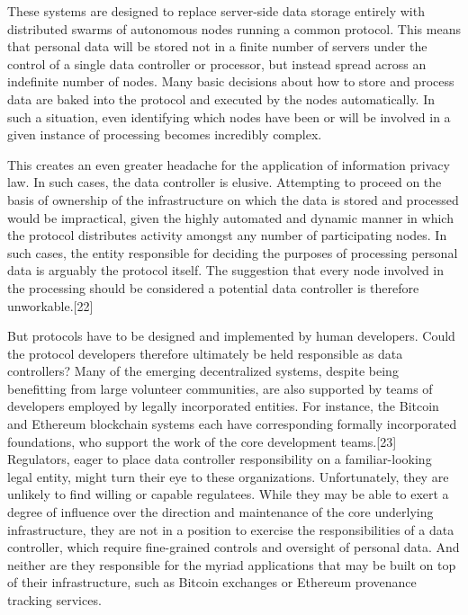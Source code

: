 \documentclass{acm_proc_article-sp}
\begin{document}
These systems are designed to replace server-side data storage entirely with distributed swarms of autonomous nodes running a common protocol. This means that personal data will be stored not in a finite number of servers under the control of a single data controller or processor, but instead spread across an indefinite number of nodes. Many basic decisions about how to store and process data are baked into the protocol and executed by the nodes automatically. In such a situation, even identifying which nodes have been or will be involved in a given instance of processing becomes incredibly complex.
 
This creates an even greater headache for the application of information privacy law. In such cases, the data controller is elusive. Attempting to proceed on the basis of ownership of the infrastructure on which the data is stored and processed would be impractical, given the highly automated and dynamic manner in which the protocol distributes activity amongst any number of participating nodes. In such cases, the entity responsible for deciding the purposes of processing personal data is arguably the protocol itself. The suggestion that every node involved in the processing should be considered a potential data controller is therefore unworkable.[22]
 
But protocols have to be designed and implemented by human developers. Could the protocol developers therefore ultimately be held responsible as data controllers? Many of the emerging decentralized systems, despite being benefitting from large volunteer communities, are also supported by teams of developers employed by legally incorporated entities. For instance, the Bitcoin and Ethereum blockchain systems each have corresponding formally incorporated foundations, who support the work of the core development teams.[23] Regulators, eager to place data controller responsibility on a familiar-looking legal entity, might turn their eye to these organizations. Unfortunately, they are unlikely to find willing or capable regulatees. While they may be able to exert a degree of influence over the direction and maintenance of the core underlying infrastructure, they are not in a position to exercise the responsibilities of a data controller, which require fine-grained controls and oversight of personal data. And neither are they responsible for the myriad applications that may be built on top of their infrastructure, such as Bitcoin exchanges or Ethereum provenance tracking services.
 
\end{document}
